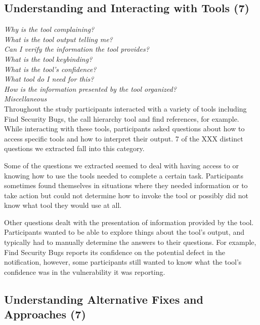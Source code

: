\documentclass[conference]{IEEEtran}
\begin{document}

\noindent\subsection{\textbf{Understanding and Interacting with Tools (7)}}

\noindent\emph{Why is the tool complaining?} \\
\emph{What is the tool output telling me?} \\
\emph{Can I verify the information the tool provides?} \\
\emph{What is the tool keybinding?} \\
\emph{What is the tool's confidence?} \\
\emph{What tool do I need for this?} \\
\emph{How is the information presented by the tool organized?} \\
\emph{Miscellaneous} \\

Throughout the study participants interacted with a variety of tools including Find Security Bugs, the call hierarchy tool and find references, for example. While interacting with these tools, participants asked questions about how to access specific tools and how to interpret their output. 7 of the XXX distinct questions we extracted fall into this category.

Some of the questions we extracted seemed to deal with having access to or knowing how to use the tools needed to complete a certain task. Participants sometimes found themselves in situations where they needed information or to take action but could not determine how to invoke the tool or possibly did not know what tool they would use at all. 

Other questions dealt with the presentation of information provided by the tool. Participants wanted to be able to explore things about the tool's output, and typically had to manually determine the answers to their questions. For example, Find Security Bugs reports its confidence on the potential defect in the notification, however, some participants still wanted to know what the tool's confidence was in the vulnerability it was reporting.  





\noindent\subsection{\textbf{Understanding Alternative Fixes and Approaches (7)}}
\end{document}
